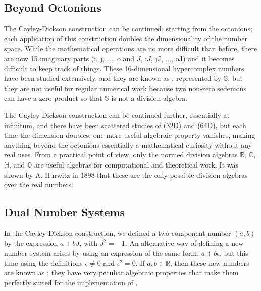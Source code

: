 \subsection{Beyond Octonions}
The Cayley-Dickson construction can be continued, starting from the octonions; each application of this construction doubles the dimensionality of the number space. While the mathematical operations are no more difficult than before, there are now 15 imaginary parts ($\mathrm{i}$, $\mathrm{j}$, $\ldots$, $\mathrm{o}$ and  $J$, $\mathrm{i}J$, $\mathrm{jJ}$, $\ldots$, $\mathrm{oJ}$) and it becomes difficult to keep track of things. These 16-dimensional hypercomplex numbers have been studied extensively, and they are known as , represented by $\mathbb{S}$, but they are not useful for regular numerical work because  two non-zero sedenions can have a zero product so that $\mathbb{S}$ is not a division algebra.  

The Cayley-Dickson construction can  be continued further, essentially at infinitum, and there have been scattered studies of  (32D) and  (64D), but each time the dimension doubles, one more useful algebraic property vanishes, making anything beyond the octonions essentially a mathematical curiosity without any real uses.  From a practical point of view, only the normed division algebras $\mathbb{R}$, $\mathbb{C}$, $\mathbb{H}$, and $\mathbb{O}$ are useful algebras for computational and theoretical work. It was shown by A. Hurwitz in 1898 \cite{hurwitz1898a} that these are the only possible division algebras over the real numbers.



\subsection{Dual Number Systems}
In the Cayley-Dickson construction, we defined a two-component number $(a,b)$ by the expression $a+bJ$, with $J^2=-1$.  An alternative way of defining a new number system arises by using an expression of the same form, $a+b\epsilon$, but this time using the definitions $\epsilon\ne 0$ and $\epsilon^2=0$.  If $a,b\in\mathbb{R}$, then these new numbers are known as ; they have very peculiar algebraic properties that make them perfectly suited for the implementation of .


